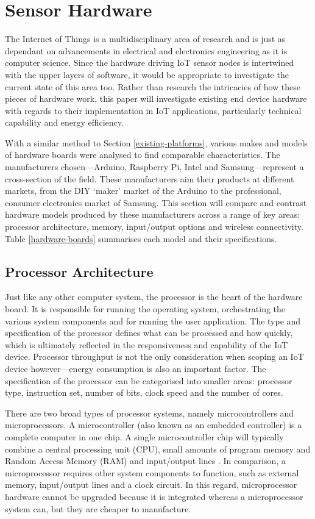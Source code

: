   \section{Sensor Hardware}
  \label{sensor-hardware}
    The Internet of Things is a multidisciplinary area of research and is just as dependant on advancements in electrical and electronics engineering as it is computer science. Since the hardware driving IoT sensor nodes is intertwined with the upper layers of software, it would be appropriate to investigate the current state of this area too. Rather than research the intricacies of how these pieces of hardware work, this paper will investigate existing end device hardware with regards to their implementation in IoT applications, particularly technical capability and energy efficiency.

    With a similar method to Section \ref{existing-platforms}, various makes and models of hardware boards were analysed to find comparable characteristics. The manufacturers chosen---Arduino, Raspberry Pi, Intel and Samsung---represent a cross-section of the field. These manufacturers aim their products at different markets, from the DIY `maker' market of the Arduino to the professional, consumer electronics market of Samsung. This section will compare and contrast hardware models produced by these manufacturers across a range of key areas: processor architecture, memory, input/output options and wireless connectivity. Table \ref{hardware-boards} summarises each model and their specifications.

    \subsection{Processor Architecture}
      Just like any other computer system, the processor is the heart of the hardware board. It is responsible for running the operating system, orchestrating the various system components and for running the user application. The type and specification of the processor defines what can be processed and how quickly, which is ultimately reflected in the responsiveness and capability of the IoT device. Processor throughput is not the only consideration when scoping an IoT device however---energy consumption is also an important factor. The specification of the processor can be categorised into smaller areas: processor type, instruction set, number of bits, clock speed and the number of cores.

      There are two broad types of processor systems, namely microcontrollers and microprocessors. A microcontroller (also known as an embedded controller) is a complete computer in one chip. A single microcontroller chip will typically combine a central processing unit (CPU), small amounts of program memory and Random Access Memory (RAM) and input/output lines \citep{microcontrollers:2011}. In comparison, a microprocessor requires other system components to function, such as external memory, input/output lines and a clock circuit. In this regard, microprocessor hardware cannot be upgraded because it is integrated whereas a microprocessor system can, but they are cheaper to manufacture.

